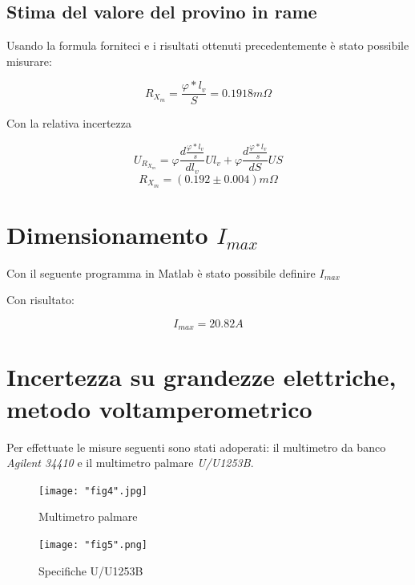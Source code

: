 \documentclass[a4paper]{article}
\begin{document}
\subsection{Stima del valore del provino in rame}
Usando la formula forniteci e i risultati ottenuti precedentemente è stato possibile misurare:
\begin{Large}
	\begin{equation}
		R_{X_{m}} =\frac{\varphi*l_v}{S}= 0.1918 m\Omega
	 \end{equation}
\end{Large}
Con la relativa incertezza
\begin{Large}
	\begin{equation}
		U_{R_{X_{m}}} = \varphi\frac{d\frac{\varphi*l_v}{s}}{dl_v}U{l_v}+\varphi\frac{d\frac{\varphi*l_v}{s}}{dS}U{S}
	 \end{equation}
	 \begin{equation}
		R_{X_{m}} =(0.192\pm 0.004 )m \Omega
	 \end{equation}
\end{Large}


\section{Dimensionamento $I_{max}$}
Con il seguente programma in Matlab è stato possibile definire $I_{max}$



Con risultato: 
\begin{Large}
	\begin{equation}
		I_{max} = 20.82 A
	 \end{equation}
\end{Large}


\section {Incertezza su grandezze elettriche, metodo voltamperometrico}
Per effettuate le misure seguenti sono stati adoperati: il multimetro da banco \emph{Agilent 34410} e il multimetro palmare \emph{U/U1253B}.
\begin{figure}[htp]
	\centering
	\texttt{[image: "fig4".jpg]}
	\caption{Multimetro palmare}
	\label{}
\end{figure}
\begin{figure}[htp]
	\centering
	\texttt{[image: "fig5".png]}
	\caption{Specifiche U/U1253B }
	\label{}
\end{figure}
\end{document}
